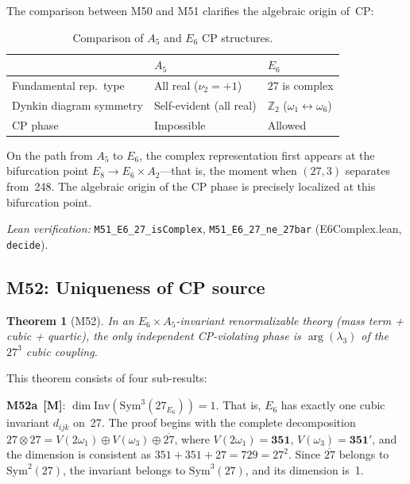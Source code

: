 \documentclass[sn-mathphys-num,Numbered]{sn-jnl}
\theoremstyle{thmstyleone}
\newtheorem{theorem}{Theorem}[section]
\theoremstyle{thmstylethree}
\newcommand{\Inv}{\mathrm{Inv}}
\newcommand{\Sym}{\mathrm{Sym}}
\newcommand{\layerM}{\textbf{[M]}}
\begin{document}
The comparison between M50 and M51 clarifies the algebraic origin of~CP:

\begin{table}[htb]
\centering
\caption{Comparison of $A_5$ and $E_6$ CP structures.}\label{tab:CP-compare}
\begin{tabular}{lll}
\toprule
 & $A_5$ & $E_6$ \\
\midrule
Fundamental rep.\ type & All real ($\nu_2 = +1$) & $27$ is complex \\
Dynkin diagram symmetry & Self-evident (all real) & $\mathbb{Z}_2$
  ($\omega_1 \leftrightarrow \omega_6$) \\
CP phase & Impossible & Allowed \\
\bottomrule
\end{tabular}
\end{table}

On the path from $A_5$ to $E_6$, the complex representation first appears at
the bifurcation point $E_8 \to E_6 \times A_2$---that is, the moment when
$(27,3)$ separates from~248.  The algebraic origin of the CP phase is
precisely localized at this bifurcation point.

\noindent\textit{Lean verification:}
\texttt{M51\_E6\_27\_isComplex}, \texttt{M51\_E6\_27\_ne\_27bar}
(E6Complex.lean, \texttt{decide}).


\subsection{M52: Uniqueness of CP source}\label{sec:M52}

\begin{theorem}[M52]\label{thm:M52}
In an $E_6 \times A_5$-invariant renormalizable theory (mass term + cubic +
quartic), the only independent CP-violating phase is $\arg(\lambda_3)$ of the
$27^3$ cubic coupling.
\end{theorem}

This theorem consists of four sub-results:

\textbf{M52a}~\layerM: $\dim \Inv(\Sym^3(27_{E_6})) = 1$.  That is, $E_6$
has exactly one cubic invariant $d_{ijk}$ on~27.  The proof begins with the
complete decomposition $27 \otimes 27 = V(2\omega_1) \oplus V(\omega_3) \oplus
\overline{27}$, where $V(2\omega_1) = \mathbf{351}$, $V(\omega_3) =
\mathbf{351}'$, and the dimension is consistent as $351 + 351 + 27 = 729 =
27^2$.  Since $\overline{27}$ belongs to $\Sym^2(27)$, the invariant belongs to
$\Sym^3(27)$, and its dimension is~1.
\end{document}
